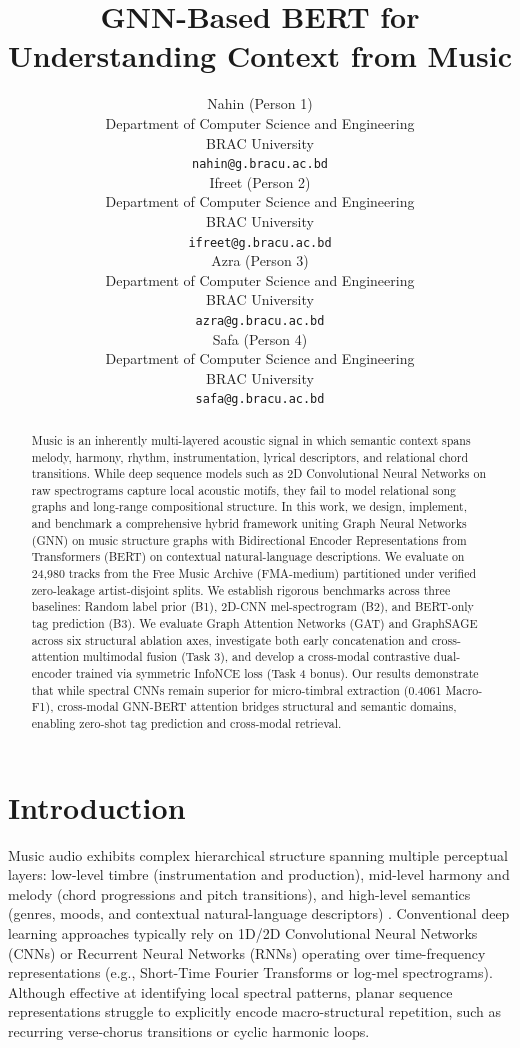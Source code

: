\documentclass{article}
\title{GNN-Based BERT for Understanding Context from Music}
\author{%
  Nahin (Person 1) \\
  Department of Computer Science and Engineering \\
  BRAC University \\
  \texttt{nahin@g.bracu.ac.bd} \\
  \And
  Ifreet (Person 2) \\
  Department of Computer Science and Engineering \\
  BRAC University \\
  \texttt{ifreet@g.bracu.ac.bd} \\
  \And
  Azra (Person 3) \\
  Department of Computer Science and Engineering \\
  BRAC University \\
  \texttt{azra@g.bracu.ac.bd} \\
  \And
  Safa (Person 4) \\
  Department of Computer Science and Engineering \\
  BRAC University \\
  \texttt{safa@g.bracu.ac.bd} \\
}
\begin{document}
\maketitle

\begin{abstract}
Music is an inherently multi-layered acoustic signal in which semantic context spans melody, harmony, rhythm, instrumentation, lyrical descriptors, and relational chord transitions. While deep sequence models such as 2D Convolutional Neural Networks on raw spectrograms capture local acoustic motifs, they fail to model relational song graphs and long-range compositional structure. In this work, we design, implement, and benchmark a comprehensive hybrid framework uniting Graph Neural Networks (GNN) on music structure graphs with Bidirectional Encoder Representations from Transformers (BERT) on contextual natural-language descriptions. We evaluate on 24,980 tracks from the Free Music Archive (FMA-medium) partitioned under verified zero-leakage artist-disjoint splits. We establish rigorous benchmarks across three baselines: Random label prior (B1), 2D-CNN mel-spectrogram (B2), and BERT-only tag prediction (B3). We evaluate Graph Attention Networks (GAT) and GraphSAGE across six structural ablation axes, investigate both early concatenation and cross-attention multimodal fusion (Task 3), and develop a cross-modal contrastive dual-encoder trained via symmetric InfoNCE loss (Task 4 bonus). Our results demonstrate that while spectral CNNs remain superior for micro-timbral extraction (0.4061 Macro-F1), cross-modal GNN-BERT attention bridges structural and semantic domains, enabling zero-shot tag prediction and cross-modal retrieval.
\end{abstract}

\section{Introduction}
Music audio exhibits complex hierarchical structure spanning multiple perceptual layers: low-level timbre (instrumentation and production), mid-level harmony and melody (chord progressions and pitch transitions), and high-level semantics (genres, moods, and contextual natural-language descriptors) \cite{fma2017}. Conventional deep learning approaches typically rely on 1D/2D Convolutional Neural Networks (CNNs) or Recurrent Neural Networks (RNNs) operating over time-frequency representations (e.g., Short-Time Fourier Transforms or log-mel spectrograms). Although effective at identifying local spectral patterns, planar sequence representations struggle to explicitly encode macro-structural repetition, such as recurring verse-chorus transitions or cyclic harmonic loops.
\end{document}
